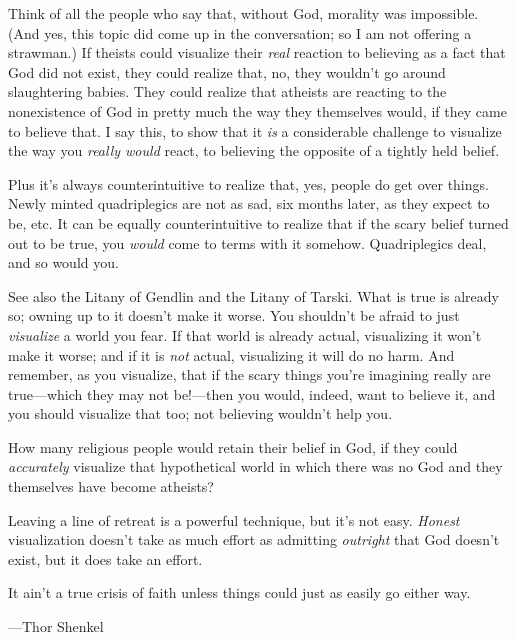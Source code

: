 {
 Think of all the people who say that, without God, morality was
impossible. (And yes, this topic did come up in the conversation; so I
am not offering a strawman.) If theists could visualize their
\textit{real} reaction to believing as a fact that God did not exist,
they could realize that, no, they wouldn't go around
slaughtering babies. They could realize that atheists are reacting to
the nonexistence of God in pretty much the way they themselves would,
if they came to believe that. I say this, to show that it \textit{is} a
considerable challenge to visualize the way you \textit{really would}
react, to believing the opposite of a tightly held belief.}

{
 Plus it's always counterintuitive to realize that,
yes, people do get over things. Newly minted quadriplegics are not as
sad, six months later, as they expect to be, etc. It can be equally
counterintuitive to realize that if the scary belief turned out to be
true, you \textit{would} come to terms with it somehow. Quadriplegics
deal, and so would you.}

{
 See also the Litany of Gendlin and the Litany of Tarski. What is
true is already so; owning up to it doesn't make it
worse. You shouldn't be afraid to just
\textit{visualize} a world you fear. If that world is already actual,
visualizing it won't make it worse; and if it is
\textit{not} actual, visualizing it will do no harm. And remember, as
you visualize, that if the scary things you're
imagining really are true---which they may not be!---then you would,
indeed, want to believe it, and you should visualize that too; not
believing wouldn't help you.}

{
 How many religious people would retain their belief in God, if
they could \textit{accurately} visualize that hypothetical world in
which there was no God and they themselves have become atheists?}

{
 Leaving a line of retreat is a powerful technique, but
it's not easy. \textit{Honest} visualization
doesn't take as much effort as admitting
\textit{outright} that God doesn't exist, but it does
take an effort.}

\myendsectiontext


\bigskip


{
 It ain't a true crisis of faith unless things
could just as easily go either way.}

{\raggedleft
 {}---Thor Shenkel
\par}


